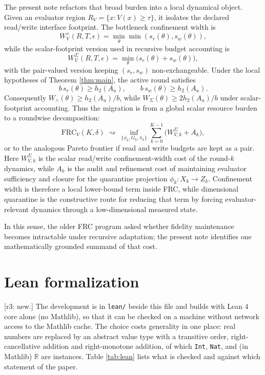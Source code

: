 \documentclass[11pt]{article}
\theoremstyle{definition}
\theoremstyle{remark}
\newcommand{\RV}{R_V}
\newcommand{\Au}{A_u}
\newcommand{\htwo}{h_2}
\newcommand{\W}{W}
\newcommand{\sr}{s_r}
\newcommand{\sw}{s_w}
\newcommand{\revnote}[1]{\textcolor{red!60!black}{[r3: #1]}}
\begin{document}
The present note refactors that broad burden into a local dynamical object. Given an evaluator region $\RV=\{x:V(x)\ge\tau\}$, it isolates the declared read/write interface footprint. The bottleneck confinement width is
\begin{equation}
\W^\wedge_V(R,T,\epsilon)=\min_\theta\min(\sr(\theta),\sw(\theta)),
\end{equation}
while the scalar-footprint version used in recursive budget accounting is
\begin{equation}
\W^\Sigma_V(R,T,\epsilon)=\min_\theta\big(\sr(\theta)+\sw(\theta)\big),
\end{equation}
with the pair-valued version keeping $(\sr,\sw)$ non-exchangeable. Under the local hypotheses of Theorem \ref{thm:main}, the active round satisfies
\begin{equation}
b\,\sr(\theta)\ge\htwo(\Au),\qquad b\,\sw(\theta)\ge\htwo(\Au).
\end{equation}
Consequently $\W_\wedge(\theta)\ge\htwo(\Au)/b$, while $\W_\Sigma(\theta)\ge2\htwo(\Au)/b$ under scalar-footprint accounting. Thus the migration is from a global scalar resource burden to a roundwise decomposition:
\begin{equation}
\mathrm{FRC}_V(K,\delta)\ \rightsquigarrow\ \inf_{\{\phi_k,G_k,\pi_k\}}\sum_{k=0}^{K-1}\big(\W^\Sigma_{V,k}+A_k\big),
\end{equation}
or to the analogous Pareto frontier if read and write budgets are kept as a pair. Here $\W^\Sigma_{V,k}$ is the scalar read/write confinement-width cost of the round-$k$ dynamics, while $A_k$ is the audit and refinement cost of maintaining evaluator sufficiency and closure for the quarantine projection $\phi_k:X_k\to Z_k$. Confinement width is therefore a local lower-bound term inside FRC, while dimensional quarantine is the constructive route for reducing that term by forcing evaluator-relevant dynamics through a low-dimensional measured state.

In this sense, the older FRC program asked whether fidelity maintenance becomes intractable under recursive adaptation; the present note identifies one mathematically grounded summand of that cost.

\section{Lean formalization}\label{app:lean}
\revnote{new.} The development is in \texttt{lean/} beside this file and builds with Lean 4 core alone (no Mathlib), so that it can be checked on a machine without network access to the Mathlib cache. The choice costs generality in one place: real numbers are replaced by an abstract value type with a transitive order, right-cancellative addition and right-monotone addition, of which \texttt{Int}, \texttt{Nat}, and (in Mathlib) $\mathbb R$ are instances. Table \ref{tab:lean} lists what is checked and against which statement of the paper.
\end{document}
